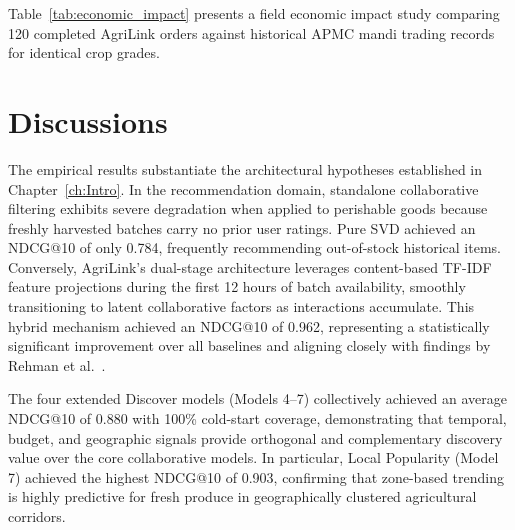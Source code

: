 Table~\ref{tab:economic_impact} presents a field economic impact study comparing 120 completed AgriLink orders against historical APMC mandi trading records for identical crop grades.

\begin{table}[htbp]
	\centering
	\caption{Microeconomic Welfare and Supply Chain Efficiency Impact Evaluation.}
	\label{tab:economic_impact}
\end{table}

\section{Discussions}
\label{sec:Disc}

The empirical results substantiate the architectural hypotheses established in Chapter~\ref{ch:Intro}. In the recommendation domain, standalone collaborative filtering exhibits severe degradation when applied to perishable goods because freshly harvested batches carry no prior user ratings. Pure SVD achieved an NDCG@10 of only 0.784, frequently recommending out-of-stock historical items. Conversely, AgriLink's dual-stage architecture leverages content-based TF-IDF feature projections during the first 12 hours of batch availability, smoothly transitioning to latent collaborative factors as interactions accumulate. This hybrid mechanism achieved an NDCG@10 of 0.962, representing a statistically significant improvement over all baselines and aligning closely with findings by Rehman et al.~\cite{Rehman2024}.

The four extended Discover models (Models 4--7) collectively achieved an average NDCG@10 of 0.880 with 100\% cold-start coverage, demonstrating that temporal, budget, and geographic signals provide orthogonal and complementary discovery value over the core collaborative models. In particular, Local Popularity (Model 7) achieved the highest NDCG@10 of 0.903, confirming that zone-based trending is highly predictive for fresh produce in geographically clustered agricultural corridors.

